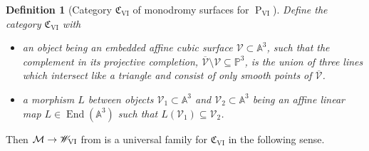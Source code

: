 \documentclass[a4paper,reqno]{amsart}
\numberwithin{equation}{section}
\newcommand{\pain}[1]{\operatorname{P}_{\mathrm{#1}}}
\newtheorem{definition}[theorem]{Definition}
\numberwithin{equation}{section}
\begin{document}
\begin{definition}[Category $\mathfrak{C}_{\mathrm{VI}}$ of monodromy surfaces for $\pain{VI}$]
    Define the category $\mathfrak{C}_{\mathrm{VI}}$ with
    \begin{itemize}
        \item an object being an embedded affine cubic surface $\mathcal{V}\subset\mathbb{A}^3$, such that the complement in its projective completion, $\overline{\mathcal{V}}\setminus\mathcal{V}\subseteq \mathbb{P}^3$,  is the union of three lines which intersect like a triangle and consist of only smooth points of $\overline{\mathcal{V}}$.
        \item a morphism $L$ between objects $\mathcal{V}_1\subset\mathbb{A}^3$ and $\mathcal{V}_2\subset\mathbb{A}^3$ being an affine linear map $L\in \operatorname{End}(\mathbb{A}^3)$ such that $L(\mathcal{V}_1)\subseteq \mathcal{V}_2$.
    \end{itemize}
\end{definition}



Then $\mathcal{M}\to\mathscr{W}_{\rm VI}$ from  is a universal family for $\mathfrak{C}_{\mathrm{VI}}$ in the following sense.
\end{document}
